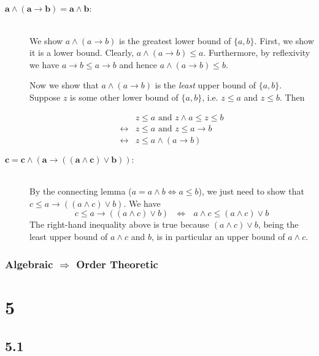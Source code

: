 \documentclass{article}
\newcommand{\mbf}{\mathbf}
\begin{document}
\begin{description}

\item[$\mbf{a \wedge (a \to b) = a \wedge b:}$]~\\

We show $a \wedge (a \to b)$ is the greatest lower bound of $\{ a, b\}$. First, we show it is a lower bound. Clearly, $a \wedge (a \to b) \leq a$. Furthermore, by reflexivity we have $a \to b \leq a \to b$ and hence $a \wedge (a \to b) \leq b$.

Now we show that $a \wedge (a \to b)$ is the \emph{least} upper bound of $\{ a, b \}$. Suppose $z$ is some other lower bound of $\{ a, b \}$, i.e. $z \leq a$ and $z \leq b$. Then

\[
\begin{array}{ll}
 ~ & z \leq a \text{ and } z \wedge a \leq z \leq b \\
 \leftrightarrow & z \leq a \text{ and } z \leq a \to b \\
 \leftrightarrow & z \leq a \wedge (a \to b)
\end{array} 
\]

\item[$\mbf{c = c \wedge (a \to ((a \wedge c) \vee b)):}$]~\\

By the connecting lemma ($a = a \wedge b \Leftrightarrow a \leq b$), we just need to show that
$c \leq a \to ((a \wedge c) \vee b)$. We have
$$c \leq a \to ((a \wedge c) \vee b)~~~\Leftrightarrow~~~a \wedge c \leq (a \wedge c) \vee b$$
The right-hand inequality above is true because $(a \wedge c) \vee b$, being the least upper bound 
of $a \wedge c$ and $b$, is in particular an upper bound of $a \wedge c$.

\end{description}

\subsubsection*{Algebraic $\Rightarrow$ Order Theoretic}

\section*{5}

\subsection*{5.1}
\end{document}

